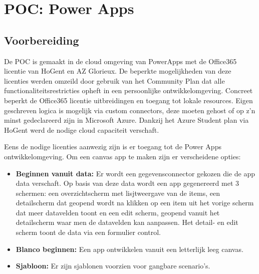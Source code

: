 
\chapter{POC: Power Apps}
\label{ch:powerapps-poc}



\section{Voorbereiding}

De POC is gemaakt in de cloud omgeving van PowerApps met de Office365 licentie van HoGent en AZ Glorieux. De beperkte mogelijkheden van deze licenties werden omzeild door gebruik van het Community Plan dat alle functionaliteitsrestricties opheft in een persoonlijke ontwikkelomgeving. Concreet beperkt de Office365 licentie uitbreidingen en toegang tot lokale resources. Eigen geschreven logica is mogelijk via custom connectors, deze moeten gehost of op z'n minst gedeclareerd zijn in Microsoft Azure. Dankzij het Azure Student plan via HoGent werd de nodige cloud capaciteit verschaft.

Eens de nodige licenties aanwezig zijn is er toegang tot de Power Apps ontwikkelomgeving. Om een canvas app te maken zijn er verscheidene opties:
\begin{itemize}
    \item \textbf{Beginnen vanuit data:} Er wordt een gegevensconnector gekozen die de app data verschaft. Op basis van deze data wordt een app gegenereerd met 3 schermen: een overzichtscherm met lisjtweergave van de items, een detailscherm dat geopend wordt na klikken op een item uit het vorige scherm dat meer datavelden toont en een edit scherm, geopend vanuit het detailscherm waar men de datavelden kan aanpassen. Het detail- en edit scherm toont de data via een formulier control.
    \item \textbf{Blanco beginnen:} Een app ontwikkelen vanuit een letterlijk leeg canvas.
    \item \textbf{Sjabloon:} Er zijn sjablonen voorzien voor gangbare scenario's.
\end{itemize}


